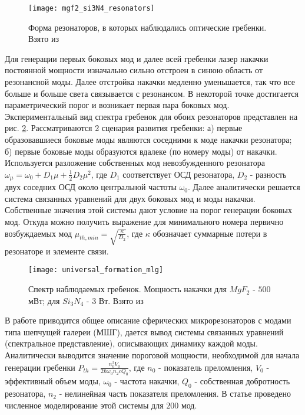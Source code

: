 \begin{figure}
  \centering
  \texttt{[image: mgf2\_si3N4\_resonators]}
  \caption{Форма резонаторов, в которых наблюдались оптические гребенки. Взято из \cite{Herr2012}}
  \label{mgf2_si3N4_resonators}
\end{figure}
Для генерации первых боковых мод и далее всей гребенки лазер накачки постоянной мощности изначально сильно отстроен в синюю область от резонансной моды. Далее отстройка накачки медленно уменьшается, так что все больше и больше света связывается с резонансом. В некоторой точке достигается параметрический порог и возникает первая пара боковых мод. Экспериментальный вид спектра гребенок для обоих резонаторов представлен на рис. \ref{universal_formation_mlg}. Рассматриваются 2 сценария развития гребенки: а) первые образовавшиеся боковые моды являются соседними к моде накачки резонатора; б) первые боковые моды образуются вдалеке (по номеру моды) от накачки. Используется разложение собственных мод невозбужденного резонатора $\omega_\mu=\omega_0+D_1\mu+\frac{1}{2}D_2\mu^2$, где $D_1$ соответствует ОСД резонатора, $D_2$ - разность двух соседних ОСД около центральной частоты $\omega_0$. Далее аналитически решается система связанных уравнений для двух боковых мод и моды накачки. Собственные значения этой системы дают условие на порог генерации боковых мод. Откуда можно получить выражение для минимального номера первично возбуждаемых мод $\mu_{th,min}=\sqrt{\frac{\kappa}{D_2}}$, где $\kappa$ обозначает суммарные потери в резонаторе и элементе связи.
\begin{figure}
  \centering
  \texttt{[image: universal\_formation\_mlg]}
  \caption{Спектр наблюдаемых гребенок. Мощность накачки для $MgF_2$ - $500$ мВт; для $Si_3N_4$ - $3$ Вт. Взято из \cite{Herr2012}}
  \label{universal_formation_mlg}
\end{figure}

В работе \cite{Chembo2010pra} приводится общее описание сферических микрорезонаторов с модами типа шепчущей галереи (МШГ), дается вывод системы связанных уравнений (спектральное представление), описывающих динамику каждой моды. Аналитически выводится значение пороговой мощности, необходимой для начала генерации гребенки $P_{th}=\frac{n_0^2 V_0}{2\hbar\omega_0 n_2 c Q_0}$, где $n_0$ - показатель преломления, $V_0$ - эффективный объем моды, $\omega_0$ - частота накачки, $Q_0$ - собственная добротность резонатора, $n_2$ - нелинейная часть показателя преломления. В статье проведено численное моделирование этой системы для $200$ мод.

